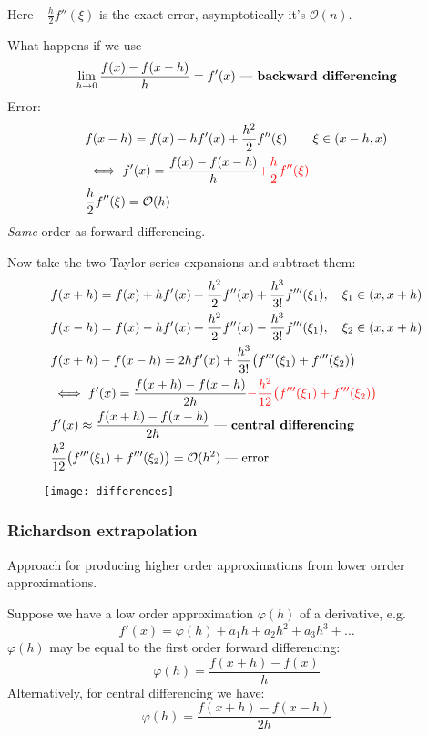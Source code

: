 Here $-\frac{h}{2} f''(\xi)$ is the exact error, asymptotically it's $\mathcal{O}(n)$.

What happens if we use
\[
    \lim_{h \to 0} \frac{f(x) - f(x-h)}{h} = f'(x) \text{ --- \textbf{backward differencing}}
\]
Error:
\begin{align*}
    &f(x - h) = f(x) - h f'(x) + \frac{h^2}{2} f''(\xi) \qquad \xi \in (x - h, x)
    \\&\iff
    f'(x) = \frac{f(x) - f(x - h)}{h} \textcolor{red}{+ \frac{h}{2} f''(\xi)}
    \\&
    \frac{h}{2} f''(\xi) = \mathcal{O}(h)
\end{align*}
\textit{Same} order as forward differencing.

Now take the two Taylor series expansions and subtract them:
\begin{align*}
    &
    f(x+h) = f(x) + hf'(x) + \frac{h^2}{2} f''(x) + \frac{h^3}{3!} f'''(\xi_1),\quad \xi_1 \in (x, x + h)
    \\&
    f(x-h) = f(x) - hf'(x) + \frac{h^2}{2} f''(x) - \frac{h^3}{3!} f'''(\xi_1),\quad \xi_2 \in (x, x + h)
    \\&
    f(x + h) - f(x - h) = 2h f'(x) + \frac{h^3}{3!} \bigl(f'''(\xi_1) + f'''(\xi_2)\bigr)
    \\&
    \iff f'(x) = \frac{f(x+h) - f(x-h)}{2h} \textcolor{red}{- \frac{h^2}{12} \bigl(f'''(\xi_1) + f'''(\xi_2)\bigr)}
    \\&
    f'(x) \approx \frac{f(x+h) - f(x-h)}{2h} \text{ --- \textbf{central differencing}}
    \\&
    \frac{h^2}{12} \bigl(f'''(\xi_1) + f'''(\xi_2)\bigr) = \mathcal{O}(h^2) \text{ --- error}
\end{align*}

\begin{figure*}[h]
    \centering
    \texttt{[image: differences]}
\end{figure*}

\subsubsection{Richardson extrapolation}
Approach for producing higher order approximations from lower orrder approximations.

Suppose we have a low order approximation $\varphi(h)$ of a derivative, e.g.
\[
    f'(x) = \varphi(h) + a_1 h + a_2 h^2 + a_3 h^3 + \dots
\]
$\varphi(h)$ may be equal to the first order forward differencing:
\[
    \varphi(h) = \frac{f(x+h) - f(x)}{h}
\]
Alternatively, for central differencing we have:
\[
    \varphi(h) = \frac{f(x+h) - f(x-h)}{2h}
\]

